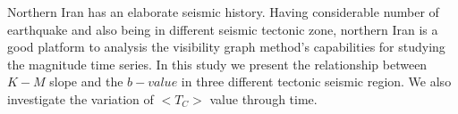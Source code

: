 \noindent
Northern Iran has an elaborate seismic history.  Having considerable number of earthquake and also being in different seismic tectonic zone, northern Iran is a good platform to analysis the visibility graph method's capabilities for studying the magnitude time series. In this study we present the relationship between $K-M$ slope and the $b-value$ in three different tectonic seismic region. We also investigate the variation of $<T_C>$ value through time.



